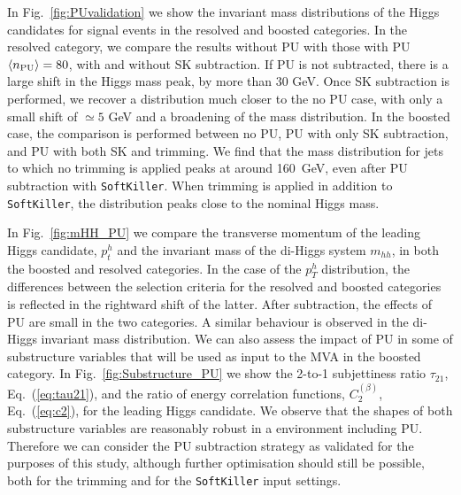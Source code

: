 %
In Fig.~\ref{fig:PUvalidation} we show the
invariant mass distributions of the
Higgs candidates for signal
events in the resolved and boosted categories.
%
 In the resolved category,
    we compare  the results without PU
    with those with PU $\left\langle n_{\rm PU}\right\rangle=80$,
    with and without SK subtraction.
    If PU is not subtracted, there is a large shift in the Higgs mass
peak, by more than 30 GeV.
%
Once SK subtraction is performed, we recover a distribution much closer
to the no PU case, with only a small shift of $\simeq 5$ GeV
and a broadening of the mass
distribution.
    In the boosted case, the comparison is performed between no PU,
    PU with only SK subtraction,
    and PU with both SK and trimming.
%
We find that
the mass distribution for jets to which no trimming
is applied peaks at around 160~GeV, even
after PU subtraction with {\tt SoftKiller}.
%
When trimming is applied in addition to {\tt SoftKiller}, 
the distribution peaks close to the nominal Higgs mass.


In Fig.~\ref{fig:mHH_PU}
we compare the transverse momentum of the leading Higgs
candidate, $p_t^{h}$ and the invariant mass of the di-Higgs system
$m_{hh}$, in both the boosted and resolved categories.
%
In the case of the $p_T^{h}$ distribution, the differences between the selection
criteria for the resolved
and boosted categories is reflected in the rightward shift of the latter.
%
After subtraction,
the effects of PU are small in the two categories.
%
A similar behaviour is observed in the di-Higgs invariant mass distribution.
%
We can also assess the impact of PU in some of
substructure variables that will be 
used as input to the MVA in the boosted category.
%
In Fig.~\ref{fig:Substructure_PU} we show the 2-to-1 subjettiness ratio
$\tau_{21}$, Eq.~(\ref{eq:tau21}), and the ratio
of energy correlation functions, $C_2^{(\beta)}$,
Eq.~(\ref{eq:c2}), for the leading Higgs candidate.
%
We observe that
the shapes of both substructure variables
are reasonably robust in a environment including PU.
%
Therefore we can consider the PU subtraction strategy
as validated for the purposes of this study, although
further optimisation should still be possible, both
for the trimming and for the {\tt SoftKiller}
input settings.

